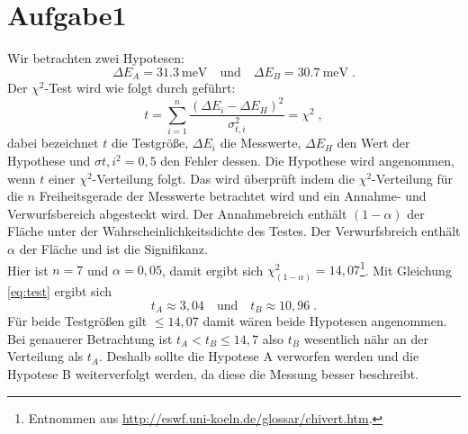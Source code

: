 \section{Aufgabe1}
\label{sec:Aufgabe1}
%
Wir betrachten zwei Hypotesen:
\begin{equation}
\Delta E_A = \SI{31.3}{\milli\eV} \quad \text{und} \quad \Delta E_B = \SI{30.7}{\milli\eV} \; .
\end{equation}
Der $\chi^2$-Test wird wie folgt durch geführt:
\begin{equation}
 t = \sum_{i=1} ^{n} \frac{(\Delta E_i - \Delta E_H)^2}{\sigma_{t,i} ^2} = \chi^2 \; ,  	
\label{eq:test}
\end{equation}
dabei bezeichnet $t$ die Testgröße, $\Delta E_i$ die Messwerte, $\Delta E_H$ den Wert der Hypothese und 
$\sigma{t,i}^2= 0,5$ den Fehler dessen. Die Hypothese wird angenommen, wenn $t$ einer $\chi^2$-Verteilung folgt. 
Das wird überprüft indem die $\chi^2$-Verteilung für die $n$ Freiheitsgerade der Messwerte betrachtet wird und 
ein Annahme- und Verwurfsbereich abgesteckt wird. Der Annahmebreich enthält $(1-\alpha)$ der Fläche unter der 
Wahrscheinlichkeitsdichte des Testes. Der Verwurfsbreich enthält $\alpha$ der Fläche und ist die 
Signifikanz. \\
Hier ist $n =7$ und $\alpha = 0,05$, damit ergibt sich $\chi^2_{(1-\alpha)} =14,07$\footnote{Entnommen aus 
\url{http://eswf.uni-koeln.de/glossar/chivert.htm}.}. 
Mit Gleichung \eqref{eq:test} ergibt sich 
\begin{equation}
t_A \approx 3,04 \quad \text{und} \quad t_B \approx 10,96 \; .
\end{equation}
Für beide Testgrößen gilt $ \leq 14,07$ damit wären beide Hypotesen angenommen. 
Bei genauerer Betrachtung ist $ t_A < t_B \leq 14,7$ also $t_B$ wesentlich nähr an der Verteilung als 
$t_A$. Deshalb sollte die Hypotese A verworfen werden und die Hypotese B weiterverfolgt werden, da diese 
die Messung besser beschreibt.
 


